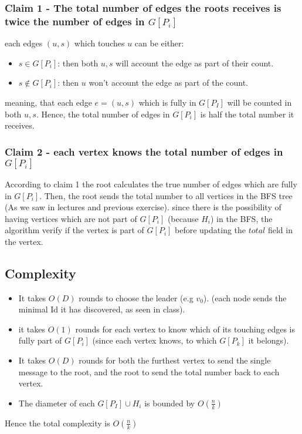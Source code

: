 \documentclass[11pt]{article}
\begin{document}
\begin{enumerate}
\subsubsection*{Claim 1 - The total number of edges the roots receives is twice the number of edges in $G[P_i]$}
each edges $(u,s)$ which touches $u$ can be either:
\begin{itemize}
    \item $s \in G[P_i]$: then both $u,s$ will account the edge as part of their count.
    \item $s \notin G[P_i]$: then $u$ won't account the edge as part of the count.
\end{itemize}
meaning, that each edge $e=(u,s)$ which is fully in $G[P_I]$ will be counted in both $u,s$.
Hence, the total number of edges in $G[P_i]$ is half the total number it receives.

\subsubsection*{Claim 2 - each vertex knows the total number of edges in $G[P_i]$}
According to claim 1 the root calculates the true number of edges which are fully in $G[P_i]$.
Then, the root sends the total number to all vertices in the BFS tree (As we saw in lectures and previous exercise). since there is the possibility of having vertices which are not part of $G[P_i]$ (because $H_i$) in the BFS, the algorithm verify if the vertex is part of $G[P_i]$ before updating the $total$ field in the vertex.



\subsection*{Complexity}
\begin{itemize}
    \item It takes $O(D)$ rounds to choose the leader (e.g $v_0$). (each node sends the minimal Id it has discovered, as seen in class).
    \item it takes $O(1)$ rounds for each vertex to know which of its touching edges is fully part of $G[P_i]$ (since each vertex knows, to which $ G[P_k] $ it belongs).
    \item It takes $O(D)$ rounds for both the furthest vertex to send the single message to the root, and the root to send the total number back to each vertex.
    \item The diameter of each $G[P_I] \cup H_i$ is bounded by $O(\frac{n}{k})$
\end{itemize}
Hence the total complexity is $O(\frac{n}{k})$

\end{enumerate}
\end{document}
